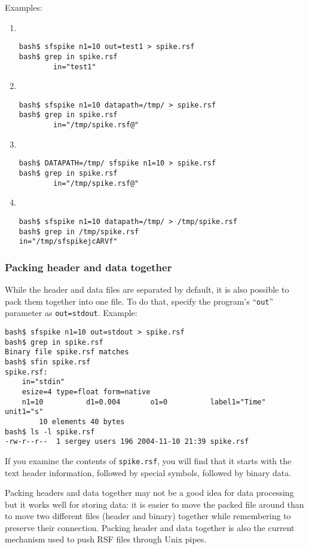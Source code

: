 Examples:
\begin{enumerate}
\item \ \\
\begin{verbatim}
bash$ sfspike n1=10 out=test1 > spike.rsf
bash$ grep in spike.rsf
        in="test1"
\end{verbatim}
\item \ \\
\begin{verbatim}
bash$ sfspike n1=10 datapath=/tmp/ > spike.rsf
bash$ grep in spike.rsf
        in="/tmp/spike.rsf@"
\end{verbatim}
\item \ \\
\begin{verbatim}
bash$ DATAPATH=/tmp/ sfspike n1=10 > spike.rsf
bash$ grep in spike.rsf
        in="/tmp/spike.rsf@"
\end{verbatim}
\item \ \\
\begin{verbatim}
bash$ sfspike n1=10 datapath=/tmp/ > /tmp/spike.rsf
bash$ grep in /tmp/spike.rsf
in="/tmp/sfspikejcARVf"
\end{verbatim}
\end{enumerate}

\subsubsection{Packing header and data together}

While the header and data files are separated by default, it is also possible
to pack them together into one file. To do that, specify the program's
``\texttt{out}'' parameter as \texttt{out=stdout}. Example:
\begin{verbatim}
bash$ sfspike n1=10 out=stdout > spike.rsf
bash$ grep in spike.rsf
Binary file spike.rsf matches
bash$ sfin spike.rsf
spike.rsf:
    in="stdin"
    esize=4 type=float form=native
    n1=10          d1=0.004       o1=0          label1="Time" unit1="s"
        10 elements 40 bytes
bash$ ls -l spike.rsf
-rw-r--r--  1 sergey users 196 2004-11-10 21:39 spike.rsf
\end{verbatim}
If you examine the contents of \texttt{spike.rsf}, you will find that it
starts with the text header information, followed by special
symbols, followed by binary data. 

Packing headers and data together may not be a good idea for data processing
but it works well for storing data: it is easier to move the packed file
around than to move two different files (header and binary) together while
remembering to preserve their connection. Packing header and data together is
also the current mechanism used to push RSF files through Unix pipes.

